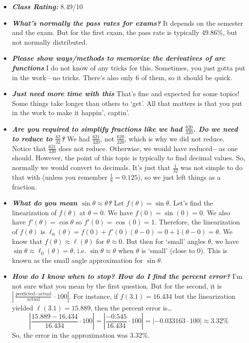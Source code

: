 \documentclass[11pt,letterpaper]{article}
\begin{document}
\begin{itemize}
\item {\bfseries\itshape Class Rating:} 8.49/10

\item {\bfseries\itshape What's normally the pass rates for exams?} It depends on the semester and the exam. But for the first exam, the pass rate is typically 49.86\%, but not normally distributed. 

\item {\bfseries\itshape Please show ways/methods to memorize the derivatives of arc functions} I do not know of any tricks for this. Sometimes, you just gotta put in the work---no tricks. There's also only 6 of them, so it should be quick.

\item {\bfseries\itshape Just need more time with this} That's fine and expected for some topics! Some things take longer than others to `get'. All that matters is that you put in the work to make it happin', captin'.

\item {\bfseries\itshape Are you required to simplify fractions like we had $\frac{620}{320}$. Do we need to reduce to $\frac{62}{32}$?} We had $\frac{621}{320}$, not $\frac{620}{320}$, which is why we did not reduce. Notice that $\frac{621}{320}$ does not reduce. Otherwise, we would have reduced---as one should. However, the point of this topic is typically to find decimal values. So, normally we would convert to decimals. It's just that $\frac{1}{32}$ was not simple to do that with (unless you remember $\frac{1}{8}= 0.125$), so we just left things as a fraction. 

\item {\bfseries\itshape What do you mean $\sin \theta \approx \theta$?} Let $f(\theta)= \sin \theta$. Let's find the linearization of $f(\theta)$ at $\theta= 0$. We have $f(0)= \sin(0)= 0$. We also have $f'(\theta)= \cos \theta$ so $f'(0)= \cos(0)= 1$. Therefore, the linearization of $f(\theta)$ is $\ell_0(\theta)= f(0) + f'(0) (\theta - 0)= 0 + 1(\theta - 0)= \theta$. We know that $f(\theta) \approx \ell(\theta)$ for $\theta \approx 0$. But then for `small' angles $\theta$, we have $\sin \theta \approx \ell_0(\theta)= \theta$, i.e. $\sin \theta \approx \theta$ when $\theta$ is `small' (close to 0). This is known as the small angle approximation for $\sin \theta$.

\item {\bfseries\itshape How do I know when to stop? How do I find the percent error?} I'm not sure what you mean by the first question. But for the second, it is $\left| \frac{\text{predicted} - \text{actual}}{\text{actual}} \cdot 100 \right|$. For instance, if $f(3.1)= 16.434$ but the linearization yielded $\ell(3.1)= 15.889$, then the percent error is\dots
	\[
	\left| \dfrac{15.889 - 16.434}{16.434} \cdot 100 \right|= \left| \dfrac{-0.545}{16.434} \cdot 100 \right|= |-0.033163 \cdot 100| \approx 3.32\%
	\]
So, the error in the approximation was 3.32\%. 


\end{itemize}
\end{document}
